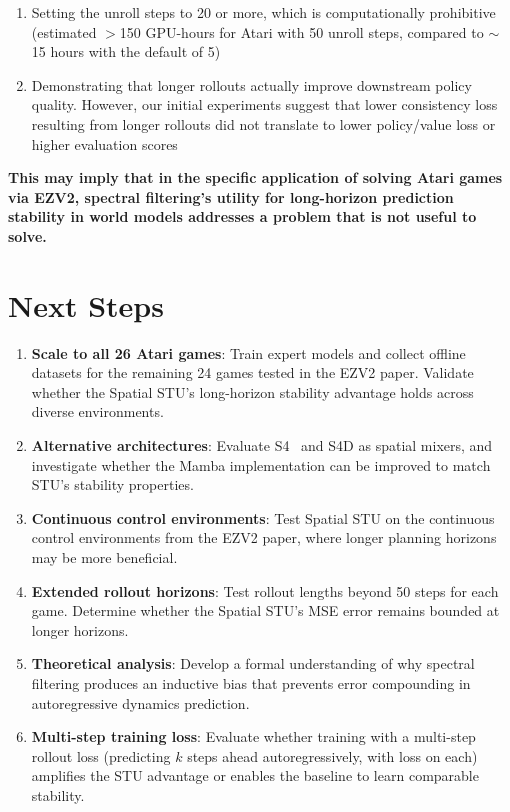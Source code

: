 \documentclass[10pt,twocolumn]{IEEEtran}
\begin{document}
\begin{enumerate}
    \item Setting the unroll steps to 20 or more, which is computationally prohibitive (estimated $>$150 GPU-hours for Atari with 50 unroll steps, compared to ${\sim}$15 hours with the default of 5)
    \item Demonstrating that longer rollouts actually improve downstream policy quality. However, our initial experiments suggest that lower consistency loss resulting from longer rollouts did not translate to lower policy/value loss or higher evaluation scores
\end{enumerate}

\textbf{This may imply that in the specific application of solving Atari games via EZV2, spectral filtering's utility for long-horizon prediction stability in world models addresses a problem that is not useful to solve.}

\section{Next Steps}
\label{sec:next-steps}

\begin{enumerate}
    \item \textbf{Scale to all 26 Atari games}: Train expert models and collect offline datasets for the remaining 24 games tested in the EZV2 paper. Validate whether the Spatial STU's long-horizon stability advantage holds across diverse environments.

    \item \textbf{Alternative architectures}: Evaluate S4~\cite{gu2022efficiently} and S4D as spatial mixers, and investigate whether the Mamba implementation can be improved to match STU's stability properties.

    \item \textbf{Continuous control environments}: Test Spatial STU on the continuous control environments from the EZV2 paper, where longer planning horizons may be more beneficial.

    \item \textbf{Extended rollout horizons}: Test rollout lengths beyond 50 steps for each game. Determine whether the Spatial STU's MSE error remains bounded at longer horizons.

    \item \textbf{Theoretical analysis}: Develop a formal understanding of why spectral filtering produces an inductive bias that prevents error compounding in autoregressive dynamics prediction.

    \item \textbf{Multi-step training loss}: Evaluate whether training with a multi-step rollout loss (predicting $k$ steps ahead autoregressively, with loss on each) amplifies the STU advantage or enables the baseline to learn comparable stability.
\end{enumerate}
\end{document}
